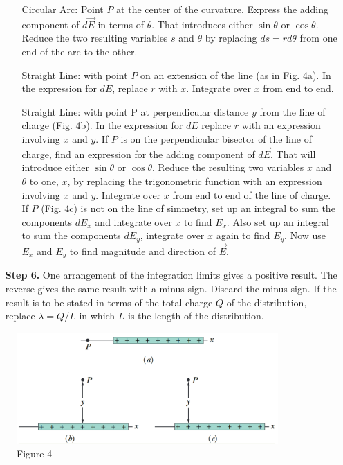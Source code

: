 \documentclass[12pt, a4paper]{article}
\begin{document}
\begin{itemize}
\begin{itemize}
					\item[Circular Arc:] Point $P$ at the center of the curvature. Express the adding component of $d\vec{E}$ in terms of $\theta$. That introduces either $\sin\theta$ or $\cos\theta$. Reduce the two resulting variables $s$ and $\theta$ by replacing $ds = rd\theta$ from one end of the arc to the other.
					
					\item[Straight Line:] with point $P$ on an extension of the line (as in Fig. 4a). In the expression for $dE$, replace $r$ with $x$. Integrate over $x$ from end to end.	
					
					\item[Straight Line:] with point P at perpendicular distance $y$ from the line of charge  (Fig. 4b). In the expression for $dE$ replace $r$ with an expression involving $x$ and $y$. If $P$ is on the perpendicular bisector of the line of charge, find an expression for the adding component of $d\vec{E}$. That will introduce either $\sin\theta$ or $\cos\theta$. Reduce the resulting two variables $x$ and $\theta$ to one, $x$, by replacing the trigonometric function with an expression involving $x$ and $y$. Integrate over $x$ from end to end of the line of charge. If $P$ (Fig. 4c) is not on the line of simmetry, set up an integral to sum the components $dE_x$ and integrate over $x$ to find $E_x$. Also set up an integral to sum the components $dE_y$, integrate over $x$ again to find $E_y$. Now use $E_x$ and $E_y$ to find magnitude and direction of $\vec{E}$.
					
				\end{itemize}
			
			\item[\textbf{Step 6.}] One arrangement of the integration limits gives a positive result. The reverse gives the same result with a minus sign. Discard the minus sign. If the result is to be stated in terms of the total charge $Q$ of the distribution, replace $\lambda = Q / L$ in which $L$ is the length of the distribution.
			
		\end{itemize}
	
		\begin{figure}
			\centering
			\includegraphics[width=10cm]{Physics2_PNGs/electric-line-charge.png}
			\caption*{Figure 4}
			\label{fig:line-of-charge}
		\end{figure}
	
\end{document}

